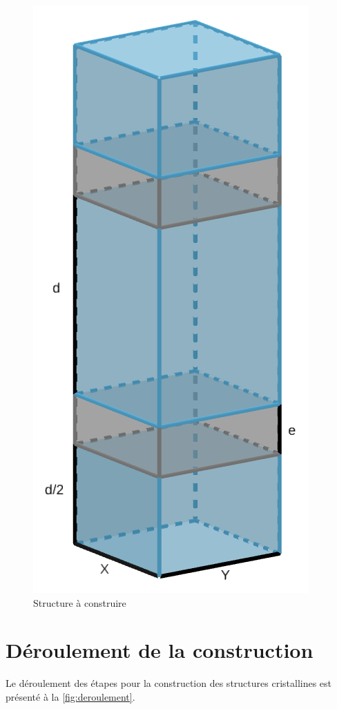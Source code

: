 \documentclass[11pt, a4paper]{article}
\begin{document}
\begin{figure}[hpbt]
	\centering
	\includegraphics[scale=0.3]{structure.png}
	\caption{Structure à construire}
	\label{fig:structure}
\end{figure}

\section{Déroulement de la construction}

Le déroulement des étapes pour la construction des structures cristallines est présenté à la \autoref{fig:deroulement}.
\end{document}
